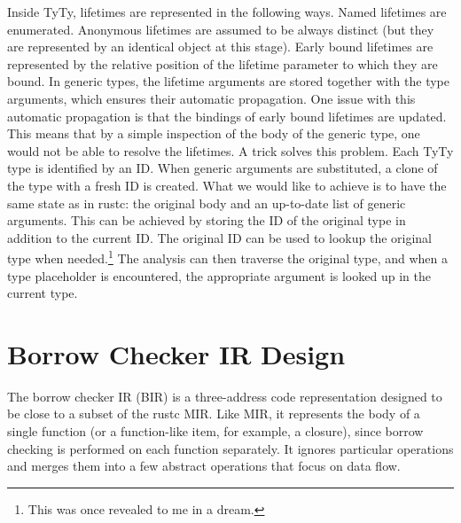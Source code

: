 \documentclass[
  11pt,
  twoside,symmetric]{report}
\begin{document}
Inside TyTy, lifetimes are represented in the following ways. Named
lifetimes are enumerated. Anonymous lifetimes are assumed to be always
distinct (but they are represented by an identical object at this
stage). Early bound lifetimes are represented by the relative position
of the lifetime parameter to which they are bound. In generic types, the
lifetime arguments are stored together with the type arguments, which
ensures their automatic propagation. One issue with this automatic
propagation is that the bindings of early bound lifetimes are updated.
This means that by a simple inspection of the body of the generic type,
one would not be able to resolve the lifetimes. A trick solves this
problem. Each TyTy type is identified by an ID. When generic arguments
are substituted, a clone of the type with a fresh ID is created. What we
would like to achieve is to have the same state as in rustc: the
original body and an up-to-date list of generic arguments. This can be
achieved by storing the ID of the original type in addition to the
current ID. The original ID can be used to lookup the original type when
needed.\footnote{This was once revealed to me in a dream.} The analysis
can then traverse the original type, and when a type placeholder is
encountered, the appropriate argument is looked up in the current type.

\section{Borrow Checker IR Design}\label{borrow-checker-ir-design}

The borrow checker IR (BIR) is a three-address code representation
designed to be close to a subset of the rustc MIR. Like MIR, it
represents the body of a single function (or a function-like item, for
example, a closure), since borrow checking is performed on each function
separately. It ignores particular operations and merges them into a few
abstract operations that focus on data flow.
\end{document}
